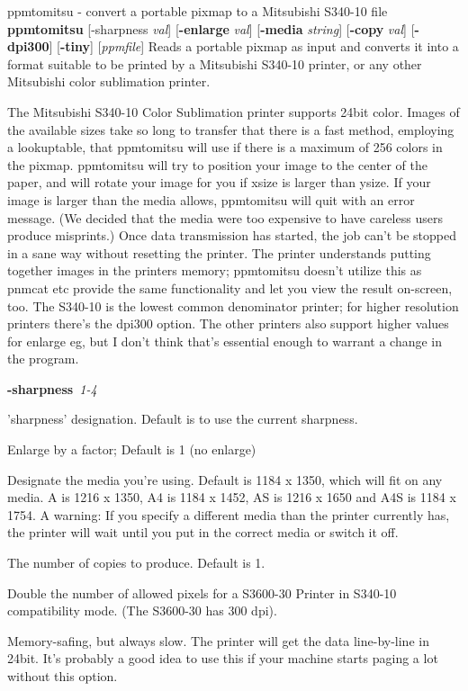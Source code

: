 ppmtomitsu - convert a portable pixmap to a Mitsubishi S340-10 file
{\bf ppmtomitsu}
{\rm [-sharpness}
{\it val}{\rm ]}
{\rm [}{\bf -enlarge}
{\it val}{\rm ]}
{\rm [}{\bf -media}
{\it string}{\rm ]}
{\rm [}{\bf -copy}
{\it val}{\rm ]}
{\rm [}{\bf -dpi300}{\rm ]}
{\rm [}{\bf -tiny}{\rm ]}
{\rm [}{\it ppmfile}{\rm ]}
Reads a portable pixmap as input and converts it into a format suitable
to be printed by a Mitsubishi S340-10 printer, or any other Mitsubishi
color sublimation printer.
\par
The Mitsubishi S340-10 Color Sublimation printer supports 24bit color.
Images of the available sizes take so long to transfer that there is a
fast method, employing a lookuptable, that ppmtomitsu will use if there
is a maximum of 256 colors in the pixmap.
ppmtomitsu will try to position your image to the center of the paper,
and will rotate your image for you if xsize is larger than ysize.
If your image is larger than the media allows, ppmtomitsu will quit
with an error message. (We decided that the media were too expensive
to have careless users produce misprints.) 
Once data transmission has started, the job can't be stopped in a
sane way without resetting the printer.
The printer understands putting together images in the printers memory;
ppmtomitsu doesn't utilize this as pnmcat etc provide the same functionality
and let you view the result on-screen, too.
The S340-10 is the lowest common denominator printer; for higher
resolution printers there's the dpi300 option. The other printers also
support higher values for enlarge eg, but I don't think that's essential
enough to warrant a change in the program.
\begin{TPlist}{{\bf -sharpness}{\it \ 1-4}
}
\item[{{\bf -sharpness}{\it \ 1-4}
}]
 'sharpness' designation. Default is to use the current sharpness.
\item[{{\bf -enlarge}{\it \ 1-3}
}]
Enlarge by a factor; Default is 1 (no enlarge)
\item[{{\bf -media}{\it \ A,\ A4,\ AS,\ A4S}
}]
Designate the media you're using. Default is 1184 x 1350, which will fit
on any media. A is 1216 x 1350, A4 is 1184 x 1452, AS is 1216 x 1650 and 
A4S is 1184 x 1754. A warning: If you specify a different media than the
printer currently has, the printer will wait until you put in the correct
media or switch it off.
\item[{{\bf -copy}{\it \ 1-9}
}]
The number of copies to produce. Default is 1.
\item[{{\bf -dpi300}
}]
Double the number of allowed pixels for a S3600-30 Printer in S340-10
compatibility mode. (The S3600-30 has 300 dpi).
\item[{{\bf -tiny}
}]
Memory-safing, but always slow. The printer will get the data line-by-line
in 24bit. It's probably a good idea to use this if your machine starts
paging a lot without this option.
\end{TPlist}

